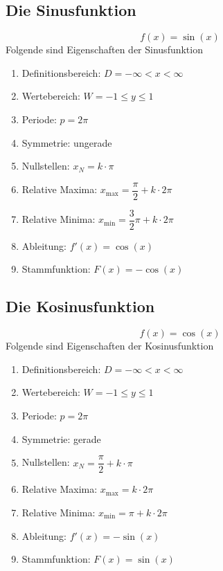\subsection{Die Sinusfunktion}
\begin{equation}
\boxed{f\left(x\right)=\sin\left(x\right)}
\end{equation}
Folgende sind Eigenschaften der Sinusfunktion
\begin{enumerate}[$(a)$]
\item Definitionsbereich: $D=-\infty < x < \infty$
\item Wertebereich: $W=-1\leq y \leq 1$
\item Periode: $p=2\pi$
\item Symmetrie: ungerade
\item Nullstellen: $x_N=k\cdot \pi$
\item Relative Maxima: $x_{\text{max}}=\dfrac{\pi}{2}+k\cdot 2\pi$
\item Relative Minima: $x_{\text{min}}=\dfrac{3}{2}\pi+k\cdot 2\pi$
\item Ableitung: $f'\left(x\right)=\cos\left(x\right)$
\item Stammfunktion: $F\left(x\right)=-\cos\left(x\right)$
\end{enumerate}
\subsection{Die Kosinusfunktion}
\begin{equation}
\boxed{f\left(x\right)=\cos\left(x\right)}
\end{equation}
Folgende sind Eigenschaften der Kosinusfunktion
\begin{enumerate}[$(a)$]
\item Definitionsbereich: $D=-\infty < x < \infty$
\item Wertebereich: $W=-1\leq y \leq 1$
\item Periode: $p=2\pi$
\item Symmetrie: gerade
\item Nullstellen: $x_N=\dfrac{\pi}{2}+k\cdot \pi$
\item Relative Maxima: $x_{\text{max}}=k\cdot 2\pi$
\item Relative Minima: $x_{\text{min}}=\pi+k\cdot 2\pi$
\item Ableitung: $f'\left(x\right)=-\sin\left(x\right)$
\item Stammfunktion: $F\left(x\right)=\sin\left(x\right)$
\end{enumerate}
